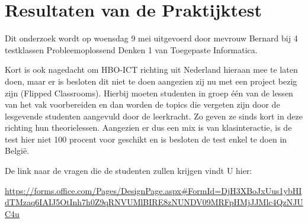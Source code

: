 
\chapter{Resultaten van de Praktijktest}
\label{ch:resultaten_praktijk}

Dit onderzoek wordt op woensdag 9 mei uitgevoerd door mevrouw Bernard bij 4 testklassen Probleemoplossend Denken 1 van Toegepaste Informatica.

Kort is ook nagedacht om HBO-ICT richting uit Nederland hieraan mee te laten doen, maar er is besloten dit niet te doen aangezien zij nu met een project bezig zijn (Flipped Classrooms). Hierbij moeten studenten in groep één van de lessen van het vak voorbereiden en dan worden de topics die vergeten zijn door de lesgevende studenten aangevuld door de leerkracht. Zo geven ze sinds kort in deze richting hun theorielessen. Aangezien er dus een mix is van klasinteractie, is de test hier niet 100 procent voor geschikt en is besloten de test enkel te doen in België.

De link naar de vragen die de studenten zullen krijgen vindt U hier:

\url{https://forms.office.com/Pages/DesignPage.aspx#FormId=DjH3XBoJxUus1ybHIdTMzaq6IAIJ5OtInh7h0Z9qRNVUMlBIRE8zNUNDV09MRFpHMjJJMlc4QzNJUC4u}




